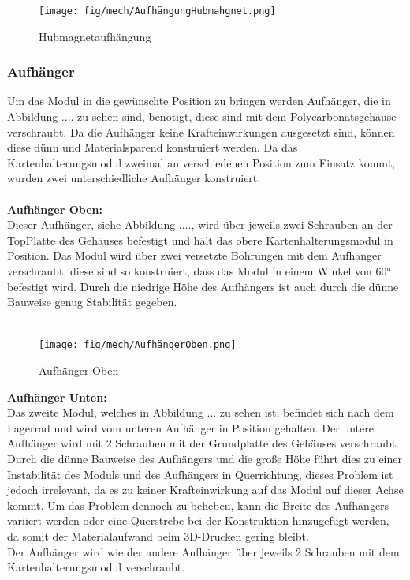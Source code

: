\begin{figure}
    \centering
    \texttt{[image: fig/mech/AufhängungHubmahgnet.png]}
    \caption{Hubmagnetaufhängung}
\end{figure}

\subsubsection{Aufhänger}
Um das Modul in die gewünschte Position zu bringen werden Aufhänger, die in Abbildung .... zu sehen sind, benötigt, diese sind mit dem Polycarbonatsgehäuse verschraubt.
Da die Aufhänger keine Krafteinwirkungen ausgesetzt sind, können diese dünn und Materialsparend konstruiert werden.
Da das Kartenhalterungsmodul zweimal an verschiedenen Position zum Einsatz kommt, wurden zwei unterschiedliche
Aufhänger konstruiert.\\\\
\textbf{Aufhänger Oben:} \\
Dieser Aufhänger, siehe Abbildung ...., wird über jeweils zwei Schrauben an der TopPlatte des Gehäuses befestigt und hält das obere Kartenhalterungsmodul in Position.
Das Modul wird über zwei versetzte Bohrungen mit dem Aufhänger verschraubt, diese sind so konstruiert, dass das Modul in einem
Winkel von 60° befestigt wird.
Durch die niedrige Höhe des Aufhängers ist auch durch die dünne Bauweise genug Stabilität gegeben.\\\\

\begin{figure}
    \centering
    \texttt{[image: fig/mech/AufhängerOben.png]}
    \caption{Aufhänger Oben}
\end{figure}

\textbf{Aufhänger Unten:}\\
Das zweite Modul, welches in Abbildung ... zu sehen ist, befindet sich nach dem Lagerrad und wird vom unteren Aufhänger in Position gehalten. Der untere Aufhänger
wird mit 2 Schrauben mit der Grundplatte des Gehäuses verschraubt. Durch die dünne Bauweise des Aufhängers und die
große Höhe führt dies zu einer Instabilität des Moduls und des Aufhängers in Querrichtung, dieses Problem ist jedoch irrelevant, da es
zu keiner Krafteinwirkung auf das Modul auf dieser Achse kommt. Um das Problem dennoch zu beheben, kann die Breite des
Aufhängers variiert werden oder eine Querstrebe bei der Konstruktion hinzugefügt werden, da somit der Materialaufwand beim 3D-Drucken gering bleibt.\\
Der Aufhänger wird wie der andere Aufhänger über jeweils 2 Schrauben mit dem Kartenhalterungsmodul verschraubt.

